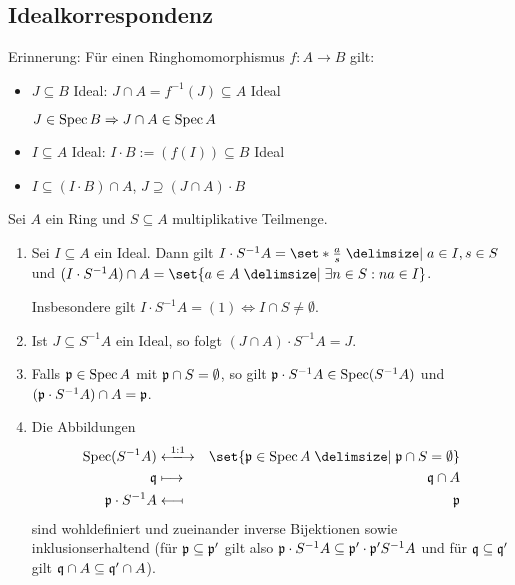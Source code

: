 \documentclass[12pt,a4paper]{scrartcl}
\theoremstyle{cplain}
\theoremstyle{cdef}
\begin{document}
\subsection{Idealkorrespondenz}
Erinnerung: Für einen Ringhomomorphismus $f\colon A\to B$ gilt:
\begin{itemize}
	\item $J\subseteq B$ Ideal: $J\cap A = f^{-1}(J)\subseteq A$ Ideal
	
	$J\in \operatorname{Spec} B \Rightarrow J\cap A \in \operatorname{Spec} A$
	\item $I\subseteq A$ Ideal: $I\cdot B := (f(I)) \subseteq B$ Ideal
	\item $I \subseteq (I\cdot B) \cap A$, $J \supseteq (J\cap A)\cdot B$
\end{itemize}
\begin{satz} \label{thm:spektrumkorrespondenz}
	Sei $A$ ein Ring und $S\subseteq A$ multiplikative Teilmenge.
	\begin{enumerate}
		\item Sei $I\subseteq A$ ein Ideal. Dann gilt $I\cdot S^{-1}A = \set*{\frac{a}{s}\given a\in I, s\in S}$ und $(I\cdot S^{-1}A)\cap A = \set{a\in A\given \exists n\in S: na \in I}$.
		
		Insbesondere gilt $I\cdot S^{-1}A = (1)\Leftrightarrow I\cap S\neq \emptyset$. \label{thm:idealkorr:i}
		\item Ist $J\subseteq S^{-1}A$ ein Ideal, so folgt $(J\cap A)\cdot S^{-1}A = J$. \label{thm:idealkorr:ii}
		\item \label{thm:idealkorr:iii} Falls $\mathfrak{p}\in\operatorname{Spec} A$ mit $\mathfrak{p}\cap S = \emptyset$, so gilt $\mathfrak{p}\cdot S^{-1}A\in \operatorname{Spec} (S^{-1}A)$ und $(\mathfrak{p}\cdot S^{-1}A)\cap A = \mathfrak{p}$.
		\item Die Abbildungen
		\begin{eqnarray*}
			\Spec(S^{-1}A) &\xlongleftrightarrow{1:1}& \set{\fp\in \Spec A \given \fp\cap S = \emptyset} \\
			\fq &\longmapsto& \fq\cap A \\
			\fp\cdot S^{-1}A &\longmapsfrom& \fp
		\end{eqnarray*}
		sind wohldefiniert und zueinander inverse Bijektionen sowie inklusionserhaltend (für $\mathfrak{p}\subseteq \mathfrak{p}'$ gilt also $\mathfrak{p}\cdot S^{-1}A\subseteq \mathfrak{p}'\cdot \mathfrak{p}'S^{-1}A$ und für $\mathfrak{q}\subseteq \mathfrak{q}'$ gilt $\mathfrak{q}\cap A\subseteq \mathfrak{q}'\cap A$). \label{thm:idealkorr:iv}
	\end{enumerate}
\end{satz}
\end{document}
